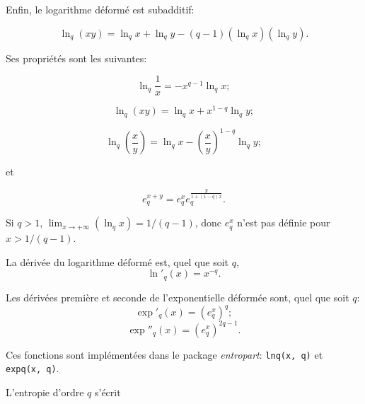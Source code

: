 \documentclass[
  11pt,
  french,
  a4paper,
  extrafontsizes,onecolumn,openright
  ]{memoir}
\begin{document}
\normalsize

Enfin, le logarithme déformé est subadditif:

\begin{equation}
  \label{eq:lnqsubadd}
  \ln_q\left(xy\right)=\ln_q{x}+\ln_q{y}-\left(q-1\right)\left(\ln_q{x}\right)\left(\ln_q{y}\right).
\end{equation}

Ses propriétés sont les suivantes:

\begin{equation}
  \label{eq:lnqinv}
  \ln_q\frac{1}{x}=-x^{q-1}\ln_qx;
\end{equation}

\begin{equation}
  \label{eq:lnqprod}
  \ln_q\left(xy\right)=\ln_q{x}+x^{1-q}\ln_q{y};
\end{equation}

\begin{equation}
  \label{eq:lnqdiv}
  \ln_q\left(\frac{x}{y}\right)=\ln_q{x}-{\left(\frac{x}{y}\right)}^{1-q}\ln_q{y};
\end{equation}

et

\begin{equation}
  \label{eq:expqsum}
  e^{x+y}_q = e_q^x e^{\frac{y}{1+\left(1-q\right)x}}_q.
\end{equation}

Si \(q>1\), \({\mathop{\lim}_{x\to +\infty} \left(\ln_q{x}\right)={1}/{\left(q-1\right)}}\), donc \(e^x_q\) n'est pas définie pour \(x>{1}/{\left(q-1\right)}\).

La dérivée du logarithme déformé est, quel que soit \(q\),
\begin{equation}
  \label{eq:lnqprime}
  \ln'_q\left(x\right) = x^{-q}.
\end{equation}

Les dérivées première et seconde de l'exponentielle déformée sont, quel que soit \(q\):
\begin{equation}
  \label{eq:expqprime}
  \exp'_q\left(x\right) = \left( e_q^x \right)^{q};
\end{equation}
\begin{equation}
  \label{eq:expqsec}
  \exp''_q\left(x\right) = \left( e_q^x \right)^{2q-1}.
\end{equation}

Ces fonctions sont implémentées dans le package \emph{entropart}: \texttt{lnq(x,\ q)} et \texttt{expq(x,\ q)}.

L'entropie d'ordre \(q\) s'écrit
\end{document}
